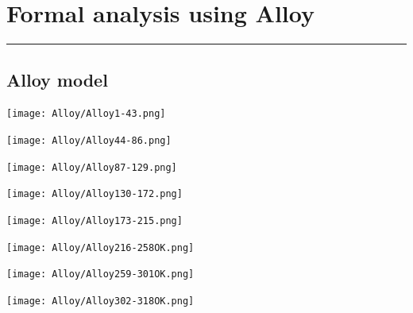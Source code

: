\documentclass[12pt]{article}
\begin{document}
\newpage
\section{Formal analysis using Alloy}
\hrule
\vspace{2mm}
\subsection{Alloy model}
\begin{center}

\texttt{[image: Alloy/Alloy1-43.png]}   

\end{center}

\begin{center}

\texttt{[image: Alloy/Alloy44-86.png]}   

\end{center}

\begin{center}

\texttt{[image: Alloy/Alloy87-129.png]}   

\end{center}


\begin{center}

\texttt{[image: Alloy/Alloy130-172.png]}   

\end{center}


\begin{center}

\texttt{[image: Alloy/Alloy173-215.png]}   

\end{center}

\begin{center}

\texttt{[image: Alloy/Alloy216-258OK.png]}   

\end{center}

\begin{center}

\texttt{[image: Alloy/Alloy259-301OK.png]}   

\end{center}


\begin{center}

\texttt{[image: Alloy/Alloy302-318OK.png]}   

\end{center}
\end{document}
